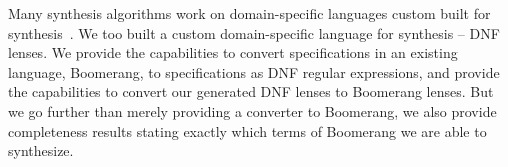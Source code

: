 \documentclass[sigplan,acmsmall]{acmart}
\begin{document}
Many synthesis algorithms work on domain-specific
languages custom built for
synthesis~\cite{flashfill,le-pldi-2014,solar-lezama-thesis-2008,yag+:pldi16}.  We
too built a custom domain-specific 
language for synthesis -- DNF lenses.  We provide the capabilities to
convert specifications in an existing language, Boomerang, to specifications as
DNF regular expressions, and provide the 
capabilities to convert our generated DNF lenses to Boomerang lenses.
But we go further than merely providing a converter to Boomerang, we also
provide completeness results stating exactly which terms of Boomerang we are
able to synthesize. 


\end{document}
